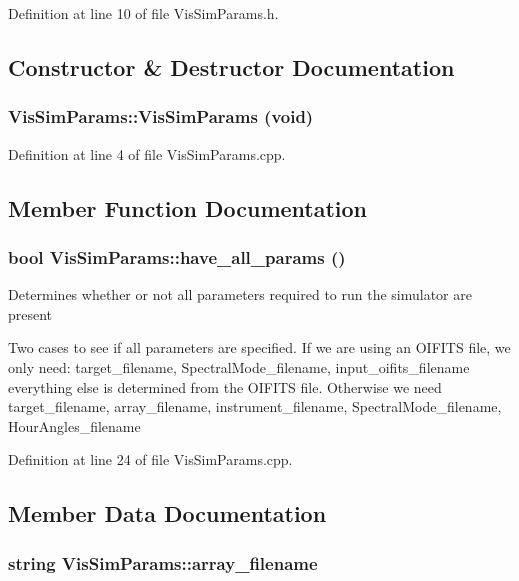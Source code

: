 Definition at line 10 of file VisSimParams.h.



\subsection{Constructor \& Destructor Documentation}
\hypertarget{classVisSimParams_a3c730d9c8f400a34aade38dbc0b0a675}{
\subsubsection[{VisSimParams}]{\setlength{\rightskip}{0pt plus 5cm}VisSimParams::VisSimParams (void)}}
\label{classVisSimParams_a3c730d9c8f400a34aade38dbc0b0a675}


Definition at line 4 of file VisSimParams.cpp.



\subsection{Member Function Documentation}
\hypertarget{classVisSimParams_a39a09952f9e7cdc3dd0f46e1604e5c76}{
\subsubsection[{have\_\-all\_\-params}]{\setlength{\rightskip}{0pt plus 5cm}bool VisSimParams::have\_\-all\_\-params ()}}
\label{classVisSimParams_a39a09952f9e7cdc3dd0f46e1604e5c76}
Determines whether or not all parameters required to run the simulator are present

Two cases to see if all parameters are specified. If we are using an OIFITS file, we only need: target\_\-filename, SpectralMode\_\-filename, input\_\-oifits\_\-filename everything else is determined from the OIFITS file. Otherwise we need target\_\-filename, array\_\-filename, instrument\_\-filename, SpectralMode\_\-filename, HourAngles\_\-filename 

Definition at line 24 of file VisSimParams.cpp.



\subsection{Member Data Documentation}
\hypertarget{classVisSimParams_ad4024dfafa47b1c4246c1885be3bd77e}{
\subsubsection[{array\_\-filename}]{\setlength{\rightskip}{0pt plus 5cm}string {\bf VisSimParams::array\_\-filename}}}
\label{classVisSimParams_ad4024dfafa47b1c4246c1885be3bd77e}


